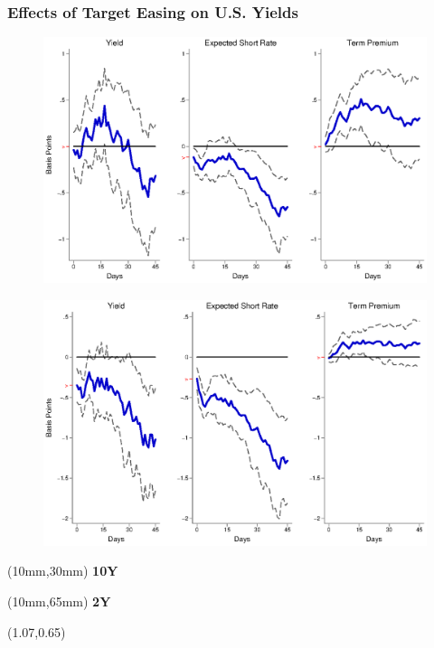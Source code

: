 \documentclass[12pt, aspectratio=169, xcolor=dvipsnames]{beamer}
\begin{document}
\begin{frame}[label=TargetUS]
\frametitle{Effects of Target Easing on U.S. Yields}
\begin{figure}[!htbp]
\begin{center} %
\includegraphics[trim={0cm 0cm 0cm 0cm},clip,height=0.45\textheight,width=0.85\linewidth]{../Figures/LPs/LagDep-FX/Target/US/DCMP/TargetUSDnomyptp120m.eps}
\par\end{center}
\end{figure}
\vspace{-0.5cm}
\begin{figure}[!htbp]
\begin{center} %
\includegraphics[trim={0cm 0cm 0cm 0.76cm},clip,height=0.45\textheight,width=0.85\linewidth]{../Figures/LPs/LagDep-FX/Target/US/DCMP/TargetUSDnomyptp24m.eps}
\par\end{center}
\end{figure}
\begin{textblock*}{8mm}(10mm,30mm)
\small \textbf{10Y}
\end{textblock*}
\begin{textblock*}{8mm}(10mm,65mm)
\small \textbf{2Y}
\end{textblock*}
\begin{textblock*}{5cm}(1.07\textwidth,0.65\textheight)
\hyperlink{TargetEM}{}
\end{textblock*}
\end{frame}
\end{document}
